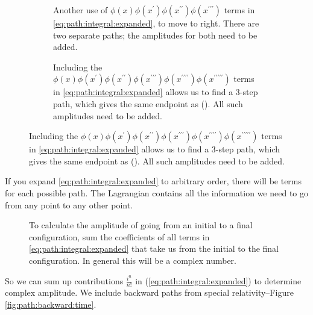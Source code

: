 \documentclass[]{article}
\begin{document}
\begin{figure}[H]
\begin{subfigure}[t]{0.45\textwidth}
	\end{subfigure}
	\begin{subfigure}[t]{0.45\textwidth}
		\caption{Another use of $\phi(x) \phi(x^\prime) \phi(x^{\prime\prime}) \phi(x^{\prime\prime\prime})$ terms in \eqref{eq:path:integral:expanded}, to move to right. There are two separate paths; the amplitudes for both need to be added.}\label{fig:path-integral8}
	\end{subfigure}
	\hfill
	\begin{subfigure}[t]{0.45\textwidth}
		\caption{Including the $\phi(x)\phi(x^\prime)\phi(x^{\prime\prime}) \phi(x^{\prime\prime\prime})\phi(x^{\prime\prime\prime\prime}) \phi(x^{\prime\prime\prime\prime\prime})$ terms in \eqref{eq:path:integral:expanded} allows us to find a 3-step path, which gives the same endpoint as  (). All such amplitudes need to be added.}\label{fig:path-integral9}
	\end{subfigure}
\end{figure}

If you expand \eqref{eq:path:integral:expanded} to arbitrary order, there will be terms for each possible path. The Lagrangian contains all the information we need to go from any point to any other point.
\begin{figure}[H]
	\begin{center}
		\caption[The amplitude of going from an initial to a final configuration]{To calculate the amplitude of going from an initial to a final configuration, sum the coefficients of all terms in \eqref{eq:path:integral:expanded} that take us from the initial to the final configuration. In general this will be a complex number.}
	\end{center} 
\end{figure}
So we can sum up contributions $\frac{i^n}{n !}$ in (\ref{eq:path:integral:expanded}) to determine complex amplitude. We include backward paths from special relativity--Figure \ref{fig:path:backward:time}.
\end{document}
